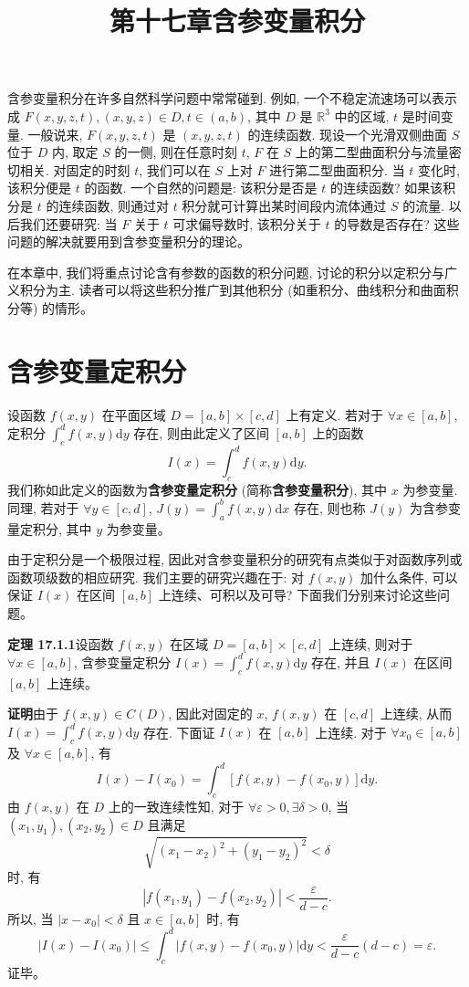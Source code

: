 \documentclass[UTF8,12pt,a4paper,fontset=fandol]{ctexart}
\title{第十七章\quad 含参变量积分}
\author{}
\date{}
\begin{document}
\maketitle

含参变量积分在许多自然科学问题中常常碰到. 例如, 一个不稳定流速场可以表示成 $F(x,y,z,t),(x,y,z)\in D,t\in(a,b)$, 其中 $D$ 是 $\mathbb R^3$ 中的区域, $t$ 是时间变量. 一般说来, $F(x,y,z,t)$ 是 $(x,y,z,t)$ 的连续函数. 现设一个光滑双侧曲面 $S$ 位于 $D$ 内, 取定 $S$ 的一侧, 则在任意时刻 $t$, $F$ 在 $S$ 上的第二型曲面积分与流量密切相关. 对固定的时刻 $t$, 我们可以在 $S$ 上对 $F$ 进行第二型曲面积分. 当 $t$ 变化时, 该积分便是 $t$ 的函数. 一个自然的问题是: 该积分是否是 $t$ 的连续函数? 如果该积分是 $t$ 的连续函数, 则通过对 $t$ 积分就可计算出某时间段内流体通过 $S$ 的流量. 以后我们还要研究: 当 $F$ 关于 $t$ 可求偏导数时, 该积分关于 $t$ 的导数是否存在? 这些问题的解决就要用到含参变量积分的理论。

在本章中, 我们将重点讨论含有参数的函数的积分问题, 讨论的积分以定积分与广义积分为主. 读者可以将这些积分推广到其他积分 (如重积分、曲线积分和曲面积分等) 的情形。

\section{含参变量定积分}

设函数 $f(x,y)$ 在平面区域 $D=[a,b]\times[c,d]$ 上有定义. 若对于 $\forall x\in[a,b]$, 定积分 $\int_c^d f(x,y)\mathrm dy$ 存在, 则由此定义了区间 $[a,b]$ 上的函数
\[
  I(x)=\int_c^d f(x,y)\mathrm dy.
\]
我们称如此定义的函数为\textbf{含参变量定积分} (简称\textbf{含参变量积分}), 其中 $x$ 为参变量. 同理, 若对于 $\forall y\in[c,d]$, $J(y)=\int_a^b f(x,y)\mathrm dx$ 存在, 则也称 $J(y)$ 为含参变量定积分, 其中 $y$ 为参变量。

由于定积分是一个极限过程, 因此对含参变量积分的研究有点类似于对函数序列或函数项级数的相应研究. 我们主要的研究兴趣在于: 对 $f(x,y)$ 加什么条件, 可以保证 $I(x)$ 在区间 $[a,b]$ 上连续、可积以及可导? 下面我们分别来讨论这些问题。

\noindent\textbf{定理 17.1.1}\quad 设函数 $f(x,y)$ 在区域 $D=[a,b]\times[c,d]$ 上连续, 则对于 $\forall x\in[a,b]$, 含参变量定积分 $I(x)=\int_c^d f(x,y)\mathrm dy$ 存在, 并且 $I(x)$ 在区间 $[a,b]$ 上连续。

\noindent\textbf{证明}\quad 由于 $f(x,y)\in C(D)$, 因此对固定的 $x$, $f(x,y)$ 在 $[c,d]$ 上连续, 从而 $I(x)=\int_c^d f(x,y)\mathrm dy$ 存在. 下面证 $I(x)$ 在 $[a,b]$ 上连续. 对于 $\forall x_0\in[a,b]$ 及 $\forall x\in[a,b]$, 有
\[
  I(x)-I(x_0)=\int_c^d [f(x,y)-f(x_0,y)]\mathrm dy.
\]
由 $f(x,y)$ 在 $D$ 上的一致连续性知, 对于 $\forall\varepsilon>0,\exists\delta>0$, 当 $(x_1,y_1),(x_2,y_2)\in D$ 且满足
\[
  \sqrt{(x_1-x_2)^2+(y_1-y_2)^2}<\delta
\]
时, 有
\[
  |f(x_1,y_1)-f(x_2,y_2)|<\frac{\varepsilon}{d-c}.
\]
所以, 当 $|x-x_0|<\delta$ 且 $x\in[a,b]$ 时, 有
\[
  |I(x)-I(x_0)|
  \leqslant \int_c^d |f(x,y)-f(x_0,y)|\mathrm dy
  < \frac{\varepsilon}{d-c}(d-c)=\varepsilon.
\]
证毕。
\end{document}
